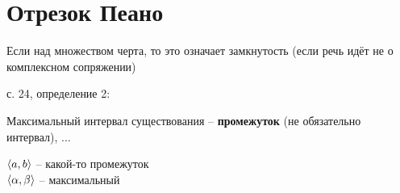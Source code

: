 \section{Отрезок Пеано}

\begin{notation}
	Если над множеством черта, то это означает замкнутость (если речь идёт не о комплексном сопряжении)
\end{notation}

с. 24, определение 2:
\begin{definition}
	Максимальный интервал существования -- \textbf{промежуток} (не обязательно интервал), ...
\end{definition}

\begin{notation}
	$ \braket{a, b} $ -- какой-то промежуток \\
	$ \braket{\alpha, \beta} $ -- максимальный
\end{notation}
